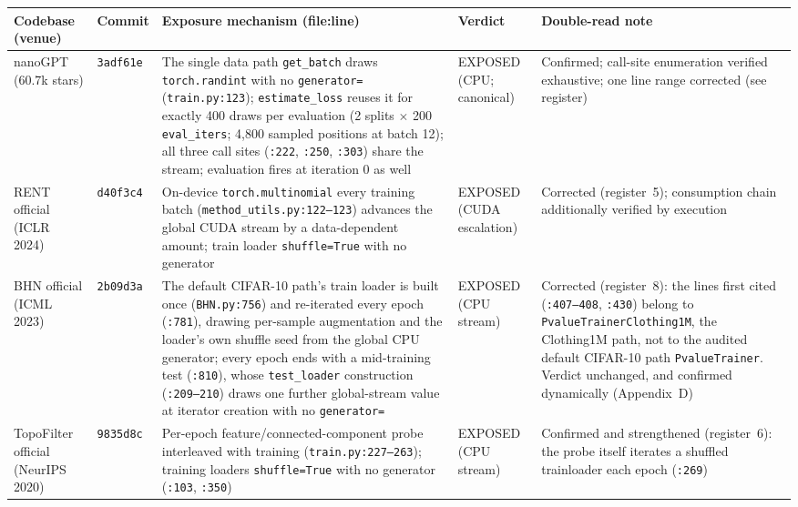 \documentclass[10pt,letterpaper]{article}
\theoremstyle{remark}
\newcommand{\code}[1]{\texttt{#1}}
\begin{document}
\begin{table}[tbp]
\centering
\footnotesize
\setlength{\tabcolsep}{4pt}
\begin{tabular}{@{}L{2.5cm}L{1.15cm}L{5.95cm}L{1.9cm}L{3.5cm}@{}}
\toprule
Codebase (venue) & Commit & Exposure mechanism (file:line) & Verdict &
Double-read note \\
\midrule
nanoGPT (60.7k stars) & \code{3adf61e} &
The single data path \code{get\_batch} draws \code{torch.randint} with no
\code{generator=} (\code{train.py:123}); \code{estimate\_loss} reuses it
for exactly 400 draws per evaluation (2 splits $\times$ 200
\code{eval\_iters}; 4{,}800 sampled positions at batch 12); all three call
sites (\code{:222}, \code{:250}, \code{:303}) share the stream; evaluation
fires at iteration 0 as well &
EXPOSED (CPU; canonical) &
Confirmed; call-site enumeration verified exhaustive; one line range
corrected (see register) \\
\addlinespace
RENT official (ICLR 2024) & \code{d40f3c4} &
On-device \code{torch.multinomial} every training batch
(\code{method\_utils.py:122--123}) advances the global CUDA stream by a
data-dependent amount; train loader \code{shuffle=True} with no generator &
EXPOSED (CUDA escalation) &
Corrected (register~5); consumption chain additionally verified by
execution \\
\addlinespace
BHN official (ICML 2023) & \code{2b09d3a} &
The default CIFAR-10 path's train loader is built once
(\code{BHN.py:756}) and re-iterated every epoch (\code{:781}), drawing
per-sample augmentation and the loader's own shuffle seed from the global
CPU generator; every epoch ends with a mid-training test
(\code{:810}), whose \code{test\_loader} construction (\code{:209--210})
draws one further global-stream value at iterator creation with no
\code{generator=} &
EXPOSED (CPU stream) &
Corrected (register~8): the lines first cited
(\code{:407--408}, \code{:430}) belong to
\code{PvalueTrainerClothing1M}, the Clothing1M path, not to the audited
default CIFAR-10 path \code{PvalueTrainer}. Verdict unchanged, and
confirmed dynamically (Appendix~D) \\
\addlinespace
TopoFilter official (NeurIPS 2020) & \code{9835d8c} &
Per-epoch feature/connected-component probe interleaved with training
(\code{train.py:227--263}); training loaders \code{shuffle=True} with no
generator (\code{:103}, \code{:350}) &
EXPOSED (CPU stream) &
Confirmed and strengthened (register~6): the probe itself iterates a
shuffled trainloader each epoch (\code{:269}) \\

\end{tabular}
\end{table}
\end{document}
